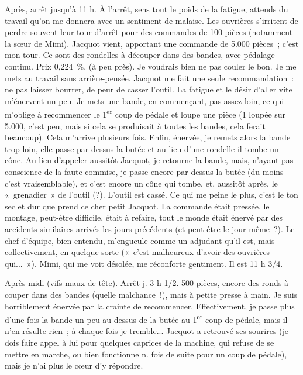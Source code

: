 \documentclass[french,twoside]{book} %
\begin{document}
Après, arrêt jusqu'à 11 h. À l'arrêt, sens tout le poids de la fatigue, attends du travail qu'on me donnera avec un sentiment de malaise. Les ouvrières s'irritent de perdre souvent leur tour d'arrêt pour des commandes de 100 pièces (notamment la sœur de Mimi). Jacquot vient, apportant une commande de 5.000 pièces ; c'est mon tour. Ce sont des rondelles à découper dans des bandes, avec pédalage continu. Prix 0,224 \%, (à peu près). Je voudrais bien ne pas couler le bon. Je me mets au travail sans arrière-pensée. Jacquot me fait une seule recommandation : ne pas laisser bourrer, de peur de casser l'outil. La fatigue et le désir d'aller vite m'énervent un peu. Je mets une bande, en commençant, pas assez loin, ce qui m'oblige à recommencer le 1\textsuperscript{er} coup de pédale et loupe une pièce (1 loupée sur 5.000, c'est peu, mais si cela se produisait à toutes les bandes, cela ferait beaucoup). Cela m'arrive plusieurs fois. Enfin, énervée, je remets alors la bande trop loin, elle passe par-dessus la butée et au lieu d'une rondelle il tombe un cône. Au lieu d'appeler aussitôt Jacquot, je retourne la bande, mais, n'ayant pas conscience de la faute commise, je passe encore par-dessus la butée (du moins c'est vraisemblable), et c'est encore un cône qui tombe, et, aussitôt après, le « grenadier » de l'outil (?). L'outil est cassé. Ce qui me peine le plus, c'est le ton sec et dur que prend ce cher petit Jacquot. La commande était pressée, le montage, peut-être difficile, était à refaire, tout le monde était énervé par des accidents similaires arrivés les jours précédents (et peut-être le jour même ?). Le chef d'équipe, bien entendu, m'engueule comme un adjudant qu'il est, mais collectivement, en quelque sorte (« c'est malheureux d'avoir des ouvrières qui... »). Mimi, qui me voit désolée, me réconforte gentiment. Il est 11 h 3/4.\par
\par
Après-midi (vifs maux de tête). Arrêt j. 3 h 1/2. 500 pièces, encore des ronds à couper dans des bandes (quelle malchance !), mais à petite presse à main. Je suis horriblement énervée par la crainte de recommencer. Effectivement, je passe plus d'une fois la bande un peu au-dessus de la butée au 1\textsuperscript{er} coup de pédale, mais il n'en résulte rien ; à chaque fois je tremble... Jacquot a retrouvé ses sourires (je dois faire appel à lui pour quelques caprices de la machine, qui refuse de se mettre en marche, ou bien fonctionne n. fois de suite pour un coup de pédale), mais je n'ai plus le cœur d'y répondre.\par
\end{document}
